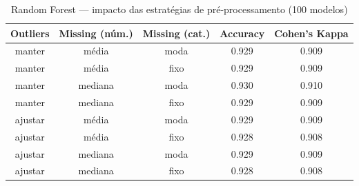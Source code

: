 \documentclass[11pt,a4paper]{article}
\begin{document}
\begin{table}[H]
    \centering
    \caption{Random Forest --- impacto das estratégias de pré-processamento (100 modelos)}
    \label{tab:rf_attr_preprocessamento}
    \begin{tabular}{ccccc}
    \toprule
    Outliers & Missing (núm.) & Missing (cat.) & Accuracy & Cohen's Kappa \\
    \midrule
    manter & média & moda & 0.929 & 0.909 \\
    manter & média & fixo & 0.929 & 0.909 \\
    manter & mediana & moda & 0.930 & 0.910 \\
    manter & mediana & fixo & 0.929 & 0.909 \\
    ajustar & média & moda & 0.929 & 0.909 \\
    ajustar & média & fixo & 0.928 & 0.908 \\
    ajustar & mediana & moda & 0.929 & 0.909 \\
    ajustar & mediana & fixo & 0.928 & 0.908 \\
    \bottomrule
    \end{tabular}
\end{table}
\end{document}

